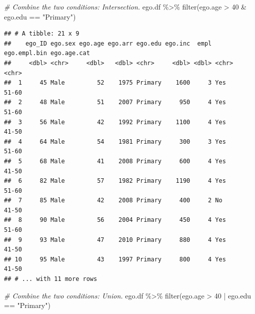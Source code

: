 \documentclass[
]{book}
\newenvironment{Shaded}{\begin{snugshade}}{\end{snugshade}}
\newcommand{\CommentTok}[1]{\textcolor[rgb]{0.56,0.35,0.01}{\textit{#1}}}
\newcommand{\DecValTok}[1]{\textcolor[rgb]{0.00,0.00,0.81}{#1}}
\newcommand{\FunctionTok}[1]{\textcolor[rgb]{0.00,0.00,0.00}{#1}}
\newcommand{\NormalTok}[1]{#1}
\newcommand{\SpecialCharTok}[1]{\textcolor[rgb]{0.00,0.00,0.00}{#1}}
\newcommand{\StringTok}[1]{\textcolor[rgb]{0.31,0.60,0.02}{#1}}
\begin{document}
\begin{Shaded}
\begin{Highlighting}[]
\CommentTok{\# Combine the two conditions: Intersection.}
\NormalTok{ego.df }\SpecialCharTok{\%\textgreater{}\%}
  \FunctionTok{filter}\NormalTok{(ego.age }\SpecialCharTok{\textgreater{}} \DecValTok{40} \SpecialCharTok{\&}\NormalTok{ ego.edu }\SpecialCharTok{==} \StringTok{"Primary"}\NormalTok{)}
\end{Highlighting}
\end{Shaded}

\begin{verbatim}
## # A tibble: 21 x 9
##    ego_ID ego.sex ego.age ego.arr ego.edu ego.inc  empl ego.empl.bin ego.age.cat
##     <dbl> <chr>     <dbl>   <dbl> <chr>     <dbl> <dbl> <chr>        <chr>      
##  1     45 Male         52    1975 Primary    1600     3 Yes          51-60      
##  2     48 Male         51    2007 Primary     950     4 Yes          51-60      
##  3     56 Male         42    1992 Primary    1100     4 Yes          41-50      
##  4     64 Male         54    1981 Primary     300     3 Yes          51-60      
##  5     68 Male         41    2008 Primary     600     4 Yes          41-50      
##  6     82 Male         57    1982 Primary    1190     4 Yes          51-60      
##  7     85 Male         42    2008 Primary     400     2 No           41-50      
##  8     90 Male         56    2004 Primary     450     4 Yes          51-60      
##  9     93 Male         47    2010 Primary     880     4 Yes          41-50      
## 10     95 Male         43    1997 Primary     800     4 Yes          41-50      
## # ... with 11 more rows
\end{verbatim}

\begin{Shaded}
\begin{Highlighting}[]
\CommentTok{\# Combine the two conditions: Union.}
\NormalTok{ego.df }\SpecialCharTok{\%\textgreater{}\%}
  \FunctionTok{filter}\NormalTok{(ego.age }\SpecialCharTok{\textgreater{}} \DecValTok{40} \SpecialCharTok{|}\NormalTok{ ego.edu }\SpecialCharTok{==} \StringTok{"Primary"}\NormalTok{)}
\end{Highlighting}
\end{Shaded}
\end{document}

